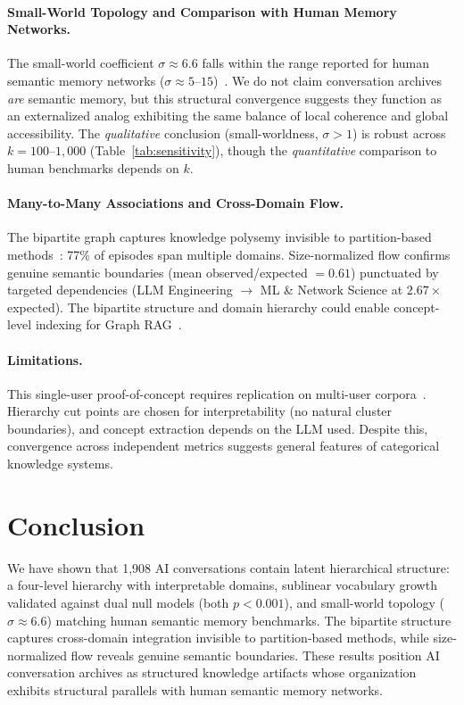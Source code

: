 \documentclass{svproc}
\begin{document}
\paragraph{Small-World Topology and Comparison with Human Memory Networks.}
The small-world coefficient $\sigma \approx 6.6$ falls within the
range reported for human semantic memory networks
($\sigma \approx 5$--$15$)~\cite{steyvers2005large}. We do not claim
conversation archives \emph{are} semantic memory, but this structural
convergence suggests they function as an externalized analog exhibiting the
same balance of local coherence and global accessibility. The
\emph{qualitative} conclusion (small-worldness, $\sigma > 1$) is robust
across $k = 100$--$1{,}000$ (Table~\ref{tab:sensitivity}), though the
\emph{quantitative} comparison to human benchmarks depends on $k$.

\paragraph{Many-to-Many Associations and Cross-Domain Flow.}
The bipartite graph captures knowledge polysemy invisible to
partition-based methods~\cite{fortunato2010community}: 77\% of episodes span
multiple domains. Size-normalized flow confirms genuine semantic boundaries
(mean observed/expected $= 0.61$) punctuated by targeted dependencies
(LLM Engineering $\to$ ML \& Network Science at $2.67\times$ expected).
The bipartite structure and domain hierarchy could enable
concept-level indexing for Graph RAG~\cite{edge2024graphrag}.

\paragraph{Limitations.}
This single-user proof-of-concept requires replication on multi-user
corpora~\cite{zhao2024wildchat,zheng2024lmsys}. Hierarchy cut points are
chosen for interpretability (no natural cluster boundaries), and concept
extraction depends on the LLM used. Despite this, convergence across
independent metrics suggests general features of categorical knowledge systems.

\FloatBarrier
\section{Conclusion}

We have shown that 1,908 AI conversations contain latent hierarchical structure:
a four-level hierarchy with interpretable domains, sublinear vocabulary growth
validated against dual null models (both $p < 0.001$),
and small-world topology ($\sigma \approx 6.6$) matching human semantic memory
benchmarks. The bipartite structure captures cross-domain integration invisible
to partition-based methods, while size-normalized flow reveals genuine semantic
boundaries. These results position AI conversation archives as structured
knowledge artifacts whose organization exhibits structural parallels with
human semantic memory networks.
\end{document}
